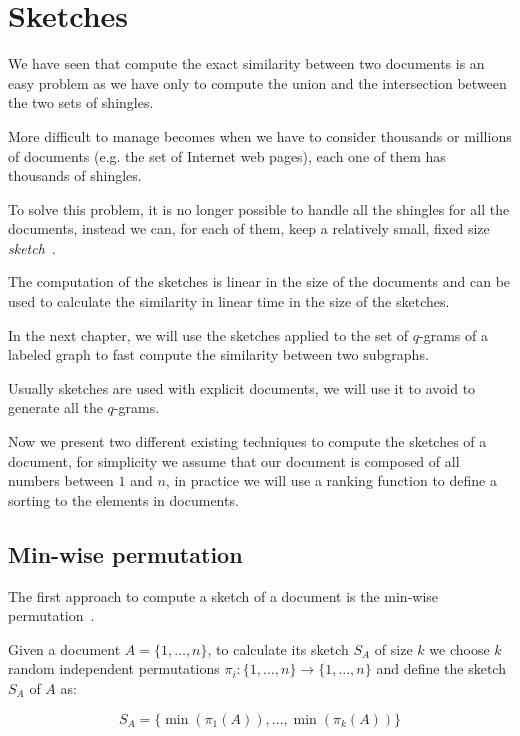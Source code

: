 \section{Sketches}

We have seen that compute the exact similarity between two documents is an easy problem
as we have only to compute the union and the intersection between the two sets of shingles.\medskip

More difficult to manage becomes when we have to consider thousands or millions of documents
(e.g. the set of Internet web pages), each one of them has thousands of shingles.\medskip

To solve this problem, it is no longer possible to handle all the shingles for all the documents, 
instead we can, for each of them, keep a relatively small, fixed size \textit{sketch}~\cite{Broder2000}.

The computation of the sketches is linear in the size of the documents and can be used to calculate the similarity in linear time in the size of the sketches.\medskip

In the next chapter, we will use the sketches applied to the set of $q$-grams of a labeled graph to fast compute the similarity between two subgraphs.\medskip

Usually sketches are used with explicit documents, we will use it to avoid to generate all the $q$-grams.\bigskip

Now we present two different existing techniques to compute the sketches of a document, 
for simplicity we assume that our document is composed of all numbers between $1$ and $n$, 
in practice we will use a ranking function to define a sorting to the elements in documents.

\subsection*{Min-wise permutation}

The first approach to compute a sketch of a document is the min-wise permutation~\cite{Broder:1998:MIP:276698.276781}.\bigskip

Given a document $A = \{1, \ldots, n\}$, to calculate its sketch $S_{A}$ of size $k$ 
we choose $k$ random independent permutations $\pi_{i} : \{1, \ldots, n\} \rightarrow \{1, \ldots, n\}$ and define the sketch $S_A$ of $A$ as:

\begin{equation}
S_{A} = \{ \min(\pi_{1}(A)), \ldots, \min(\pi_{k}(A)) \}
\end{equation}

